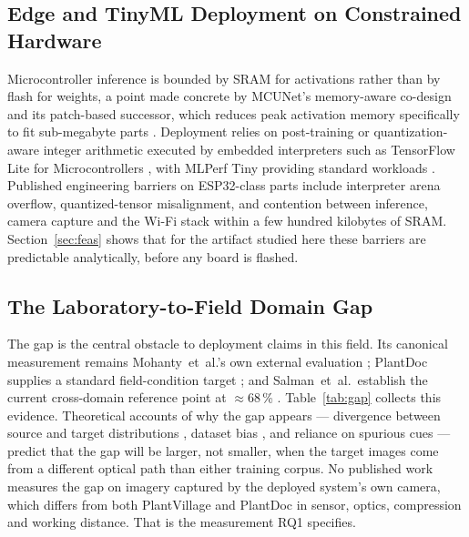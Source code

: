 \documentclass[journal]{IEEEtran}
\begin{document}
\subsection{Edge and TinyML Deployment on Constrained Hardware}

Microcontroller inference is bounded by SRAM for activations rather than by
flash for weights, a point made concrete by MCUNet's memory-aware
co-design \cite{lin2020mcunet} and its patch-based successor, which reduces
peak activation memory specifically to fit sub-megabyte parts
\cite{lin2021mcunetv2}. Deployment relies on post-training or
quantization-aware integer arithmetic \cite{jacob2018quantization,
krishnamoorthi2018whitepaper} executed by embedded interpreters such as
TensorFlow Lite for Microcontrollers \cite{david2021tflm,warden2019tinyml},
with MLPerf Tiny providing standard workloads \cite{banbury2021mlperftiny}.
Published engineering barriers on ESP32-class parts include interpreter
arena overflow, quantized-tensor misalignment, and contention between
inference, camera capture and the Wi-Fi stack within a few hundred
kilobytes of SRAM. Section~\ref{sec:feas} shows that for the artifact
studied here these barriers are predictable analytically, before any board
is flashed.

\subsection{The Laboratory-to-Field Domain Gap}

The gap is the central obstacle to deployment claims in this field. Its
canonical measurement remains Mohanty~et~al.'s own external evaluation
\cite{mohanty2016deep}; PlantDoc supplies a standard field-condition target
\cite{singh2020plantdoc}; and Salman~et~al.\ establish the current
cross-domain reference point at $\approx$68\,\%
\cite{salman2025plantdisease}. Table~\ref{tab:gap} collects this evidence.
Theoretical accounts of why the gap appears --- divergence between source
and target distributions \cite{bendavid2010theory}, dataset bias
\cite{torralba2011unbiased}, and reliance on spurious cues
\cite{geirhos2020shortcut} --- predict that the gap will be larger, not
smaller, when the target images come from a different optical path than
either training corpus. No published work measures the gap on imagery
captured by the deployed system's own camera, which differs from both
PlantVillage and PlantDoc in sensor, optics, compression and working
distance. That is the measurement RQ1 specifies.
\end{document}
